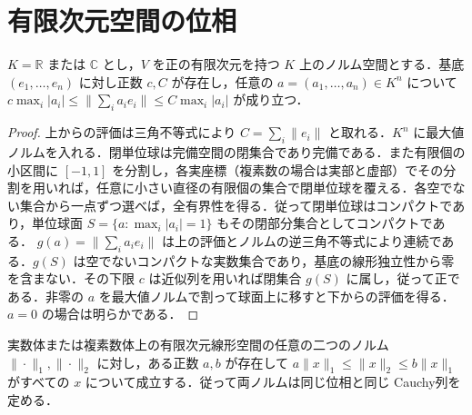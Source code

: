 \section{有限次元空間の位相}
\begin{prop}[有限次元ノルム空間の座標評価]
$K=\mathbb R$ または $\mathbb C$ とし，$V$ を正の有限次元を持つ $K$ 上のノルム空間とする．基底 $(e_1,\ldots,e_n)$ に対し正数 $c,C$ が存在し，任意の $a=(a_1,\ldots,a_n)\in K^n$ について $c\max_i|a_i|\leq\|\sum_i a_ie_i\|\leq C\max_i|a_i|$ が成り立つ．
\end{prop}
\begin{proof}
上からの評価は三角不等式により $C=\sum_i\|e_i\|$ と取れる．$K^n$ に最大値ノルムを入れる．閉単位球は完備空間の閉集合であり完備である．また有限個の小区間に $[-1,1]$ を分割し，各実座標（複素数の場合は実部と虚部）でその分割を用いれば，任意に小さい直径の有限個の集合で閉単位球を覆える．各空でない集合から一点ずつ選べば，全有界性を得る．従って閉単位球はコンパクトであり，単位球面 $S=\{a:\max_i|a_i|=1\}$ もその閉部分集合としてコンパクトである．
$g(a)=\|\sum_i a_ie_i\|$ は上の評価とノルムの逆三角不等式により連続である．$g(S)$ は空でないコンパクトな実数集合であり，基底の線形独立性から零を含まない．その下限 $c$ は近似列を用いれば閉集合 $g(S)$ に属し，従って正である．非零の $a$ を最大値ノルムで割って球面上に移すと下からの評価を得る．$a=0$ の場合は明らかである．
\end{proof}
\begin{prop}[有限次元空間上のノルムの同値性]
実数体または複素数体上の有限次元線形空間の任意の二つのノルム $\|\cdot\|_1,\|\cdot\|_2$ に対し，ある正数 $a,b$ が存在して $a\|x\|_1\leq\|x\|_2\leq b\|x\|_1$ がすべての $x$ について成立する．従って両ノルムは同じ位相と同じ Cauchy列を定める．
\end{prop}
